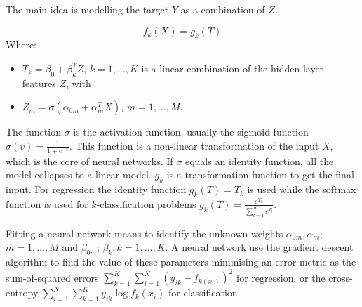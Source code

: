 The main idea is modelling the target $Y$ as a combination of $Z$.

\begin{equation}
        f_k\left(X\right)=g_k(T)
\label{eq_neuralNetwork}
\end{equation}
Where:
\begin{itemize}
    \item $T_k=\beta_0+\beta_k^TZ$, $k=1,\ldots,K$ is a linear combination of the hidden layer features $Z$, with
    \item $Z_m=\sigma(\alpha_{0m}+\alpha_m^TX)$, $m=1,\ldots,M$. 
\end{itemize}

The function $\sigma$ is the activation function, usually the sigmoid function $\sigma\left(v\right)=\frac{1}{1+e^{-v}}$. This function is a non-linear transformation of the input $X$, which is the core of neural networks. If $\sigma$ equals an identity function, all the model collapses to a linear model. $g_k$ is a transformation function to get the final input. For regression the identity function $g_k(T)=T_k$ is used while the softmax function is used for $k$-classification problems $g_k\left(T\right)=\frac{e^{T_k}}{\sum_{l=1}^{K}e^{T_l}}$.\par

Fitting a neural network means to identify the unknown weights $\alpha_{0m},\alpha_m$; $m=1,\ldots,M$ and $\beta_{0m}$; $\beta_k;k=1,\ldots,K$. A neural network use the gradient descent algorithm to find the value of these parameters minimising an error metric as the sum-of-squared errors $\sum_{k=1}^{K}\sum_{i=1}^{N}\left(y_{ik}-f_{k\left(x_i\right)}\right)^2$ for regression, or the cross-entropy  $\sum_{i=1}^{N}\sum_{k=1}^{K}{y_{ik}\log{f_k\left(x_i\right)}}$ for classification.



